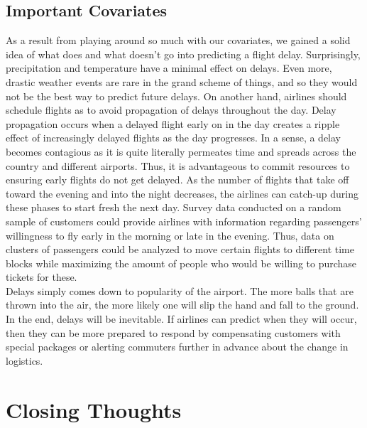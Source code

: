 \documentclass[12pt, a4paper, openany]{book}
\newcommand\tab[1][1cm]{\hspace*{#1}}
\begin{document}
	\section{Important Covariates}
	\tab As a result from playing around so much with our covariates, we gained a solid idea of what does and what doesn’t go into predicting a flight delay. Surprisingly, precipitation and temperature have a minimal effect on delays. Even more, drastic weather events are rare in the grand scheme of things, and so they would not be the best way to predict future delays. On another hand, airlines should schedule flights as to avoid propagation of delays throughout the day. Delay propagation occurs when a delayed flight early on in the day creates a ripple effect of increasingly delayed flights as the day progresses. In a sense, a delay becomes contagious as it is quite literally permeates time and spreads across the country and different airports. Thus, it is advantageous to commit resources to ensuring early flights do not get delayed. As the number of flights that take off toward the evening and into the night decreases, the airlines can catch-up during these phases to start fresh the next day. Survey data conducted on a random sample of customers could provide airlines with information regarding passengers’ willingness to fly early in the morning or late in the evening. Thus, data on clusters of passengers could be analyzed to move certain flights to different time blocks while maximizing the amount of people who would be willing to purchase tickets for these. \\
	\tab Delays simply comes down to popularity of the airport. The more balls that are thrown into the air, the more likely one will slip the hand and fall to the ground. In the end, delays will be inevitable. If airlines can predict when they will occur, then they can be more prepared to respond by compensating customers with special packages or alerting commuters further in advance about the change in logistics. 
\chapter{Closing Thoughts}
\end{document}
